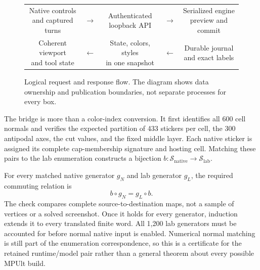 \documentclass[a4paper,11pt]{article}
\begin{document}
\begin{figure}[htbp]
\centering\small
\begin{tabular}{@{}c@{\quad}c@{\quad}c@{\quad}c@{\quad}c@{}}
\fbox{\parbox[c][15mm][c]{.24\linewidth}{\centering Native controls\\and captured turns}} & $\longrightarrow$ &
\fbox{\parbox[c][15mm][c]{.24\linewidth}{\centering Authenticated\\loopback API}} & $\longrightarrow$ &
\fbox{\parbox[c][15mm][c]{.24\linewidth}{\centering Serialized engine\\preview and commit}}\\[8pt]
\fbox{\parbox[c][15mm][c]{.24\linewidth}{\centering Coherent viewport\\and tool state}} & $\longleftarrow$ &
\fbox{\parbox[c][15mm][c]{.24\linewidth}{\centering State, colors, styles\\in one snapshot}} & $\longleftarrow$ &
\fbox{\parbox[c][15mm][c]{.24\linewidth}{\centering Durable journal\\and exact labels}}
\end{tabular}
\caption{Logical request and response flow. The diagram shows data ownership and publication boundaries, not separate processes for every box.}
\label{fig:architecture}
\end{figure}

The bridge is more than a color-index conversion. It first identifies all 600 cell normals and verifies the expected partition of 433 stickers per cell, the 300 antipodal axes, the cut values, and the fixed middle layer. Each native sticker is assigned its complete cap-membership signature and hosting cell. Matching these pairs to the lab enumeration constructs a bijection \(b:\mathcal S_{\mathrm{native}}\to\mathcal S_{\mathrm{lab}}\).

For every matched native generator \(g_N\) and lab generator \(g_L\), the required commuting relation is
\begin{equation}
b\circ g_N=g_L\circ b.
\label{eq:bridge-square}
\end{equation}
The check compares complete source-to-destination maps, not a sample of vertices or a solved screenshot. Once it holds for every generator, induction extends it to every translated finite word. All 1,200 lab generators must be accounted for before normal native input is enabled. Numerical normal matching is still part of the enumeration correspondence, so this is a certificate for the retained runtime/model pair rather than a general theorem about every possible MPUlt build.
\end{document}
